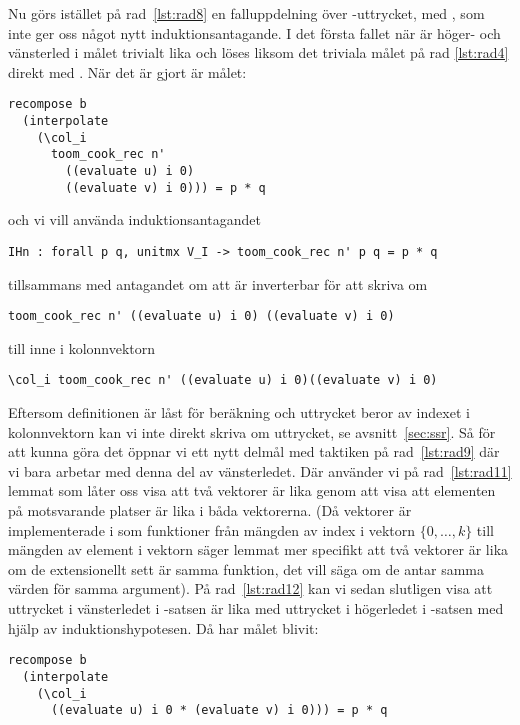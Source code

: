 Nu görs istället på rad~\ref{lst:rad8} en falluppdelning över
-uttrycket, med , som inte ger oss något nytt
induktionsantagande. I det första fallet när 
är höger- och vänsterled i målet trivialt lika och löses liksom det triviala
målet på rad \ref{lst:rad4} direkt med \C{//}. När det är gjort är målet:
\begin{lstlisting}
recompose b
  (interpolate
    (\col_i
      toom_cook_rec n'
        ((evaluate u) i 0)
        ((evaluate v) i 0))) = p * q
\end{lstlisting}
och vi vill använda induktionsantagandet
\begin{lstlisting}
IHn : forall p q, unitmx V_I -> toom_cook_rec n' p q = p * q
\end{lstlisting}
tillsammans med antagandet  om att  är inverterbar för att
skriva om
\begin{lstlisting}
toom_cook_rec n' ((evaluate u) i 0) ((evaluate v) i 0)
\end{lstlisting}
till  inne i kolonnvektorn
\begin{lstlisting}
\col_i toom_cook_rec n' ((evaluate u) i 0)((evaluate v) i 0)
\end{lstlisting}
Eftersom definitionen  är låst för beräkning och uttrycket beror av
indexet  i kolonnvektorn kan vi inte direkt skriva om uttrycket, se
avsnitt~\ref{sec:ssr}. Så för att kunna göra det öppnar vi ett nytt delmål med
taktiken  på rad~\ref{lst:rad9} där vi bara arbetar med denna del av
vänsterledet. Där använder vi på rad~\ref{lst:rad11} lemmat  som låter
oss visa att två vektorer är lika genom att visa att elementen på motsvarande
platser är lika i båda vektorerna. (Då vektorer är implementerade i \ssr{} som
funktioner från mängden av index i vektorn $\{0, \ldots , k\}$ till mängden av
element i vektorn säger lemmat mer specifikt att två vektorer är lika om de
extensionellt sett är samma funktion, det vill säga om de antar samma värden
för samma argument). På rad~\ref{lst:rad12} kan vi sedan slutligen visa att
uttrycket i vänsterledet i -satsen är lika med uttrycket i högerledet i
-satsen med hjälp av induktionshypotesen. Då har målet blivit:
\begin{lstlisting}
recompose b
  (interpolate
    (\col_i
      ((evaluate u) i 0 * (evaluate v) i 0))) = p * q
\end{lstlisting}

